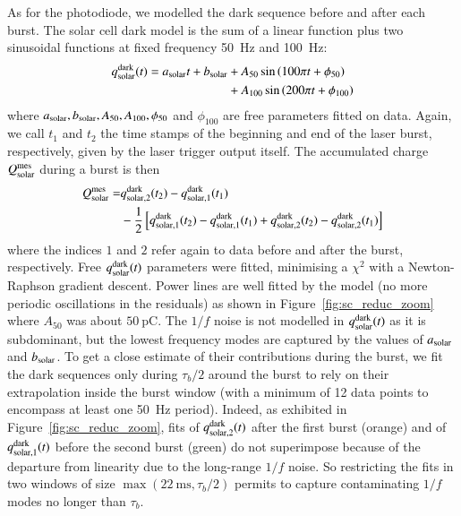 As for the photodiode, we modelled the dark sequence before and after each burst. The solar cell dark model is the sum of a linear function plus two sinusoidal functions at fixed frequency \SI{50}{\hertz} and \SI{100}{\hertz}:
\begin{align}
    q_{\rm solar}^{\rm dark}(t) = a_{\rm solar}t + b_{\rm solar} & + A_{50} \sin \left( 100 \pi t + \phi_{50}\right)  \notag \\  & +  A_{100} \sin \left( 200 \pi t + \phi_{100}\right)
\end{align}
where $a_{\rm solar}, b_{\rm solar}, A_{50}, A_{100}, \phi_{50}$ and $\phi_{100}$ are free parameters fitted on data. 
Again, we call $t_1$ and $t_2$ the time stamps of the beginning and end of the laser burst, respectively, given by the laser trigger output itself.
The accumulated charge $Q_{\mathrm{solar}}^{\mathrm{mes}}$ during a burst is then
\begin{align}\label{eq:qsolar}
Q_{\mathrm{solar}}^{\mathrm{mes}}  = & q_{\rm solar,2}^{\rm dark}(t_2) - q_{\rm solar, 1}^{\rm dark}(t_1) \\  &  - \frac{1}{2} \left[q_{\rm solar,1}^{\rm dark}(t_2) - q_{\rm solar,1}^{\rm dark}(t_1) + q_{\rm solar,2}^{\rm dark}(t_2) - q_{\rm solar,2}^{\rm dark}(t_1)  \right]    \notag
\end{align}
where the indices $1$ and $2$ refer again to data before and after the burst, respectively.  Free $q_{\rm solar}^{\rm dark}(t)$ parameters were fitted, minimising a $\chi^2$ with a Newton-Raphson gradient descent. Power lines are well fitted by the model (no more periodic oscillations in the residuals) as shown in Figure~\ref{fig:sc_reduc_zoom} where $A_{50}$ was about $\SI{50}{\pico\coulomb}$.
The $1/f$ noise is not modelled in $q_{\rm solar}^{\rm dark}(t)$ as it is subdominant, but the lowest frequency modes are captured by the values of $a_{\rm solar}$ and $b_{\rm solar}$. To get a close estimate of their contributions during the burst, we fit the dark sequences only during $\tau_b/2$ around the burst to rely on their extrapolation inside the burst window (with a minimum of 12 data points to encompass at least one \SI{50}{\hertz} period). %
Indeed, as exhibited in Figure~\ref{fig:sc_reduc_zoom}, fits of $q_{\rm solar,2}^{\rm dark}(t)$ after the first burst (orange) and of $q_{\rm solar,1}^{\rm dark}(t)$ before the second burst (green) do not superimpose because of the departure from linearity due to the long-range $1/f$ noise. So restricting the fits in two windows of size $\max(\SI{22}{\ms},\tau_b/2)$ permits to capture contaminating $1/f$ modes no longer than $\tau_b$. 

